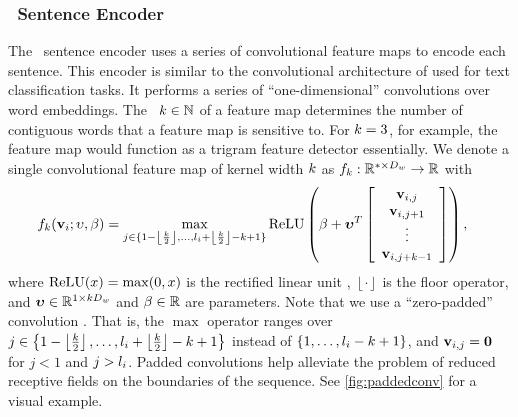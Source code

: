 \subsubsection{\ConvolutionalNeuralNetwork~Sentence Encoder} 
\label{sec:sentconvenc}

The \convolutionalneuralnetwork~sentence encoder uses a series of 
convolutional feature maps to encode each sentence. This encoder is similar
to the convolutional architecture of \citet{kim2014convolutional} used for 
text classification tasks. It performs a series of ``one-dimensional'' 
convolutions over word embeddings. The ~$k \in 
\mathbb{N}$ of a feature map determines the number of contiguous words that a 
feature map is sensitive to. For $k=3$, for example, the feature 
map would function as a trigram feature detector essentially. 
We denote a single convolutional feature map of kernel width 
$k$ as $f_k : \mathbb{R}^{*\times D_{w}} \rightarrow \mathbb{R}$ with
\begin{align}
    f_k(\mathbf{v}_i;\upsilon,\beta)  & 
= \max_{j \in \{ 
    1 - \left\lfloor \frac{k}{2} \right\rfloor, 
    \ldots, l_i +  
    \left\lfloor \frac{k}{2} \right\rfloor - k + 1 \}}
  \operatorname{ReLU}\left( \beta + \boldsymbol{\upsilon}^T \left[ \begin{array}{c} \mathbf{v}_{i,j}\\ \mathbf{v}_{i,j+1} \\ \vdots \\ \mathbf{v}_{i,j+k-1} \end{array} \right] \right),
\end{align}
where $\operatorname{ReLU}(x) = \max(0, x)$ is the rectified linear unit \citep{relu},
$\left\lfloor\cdot\right\rfloor$ is the floor operator,
and $\boldsymbol{\upsilon} \in \mathbb{R}^{1 \times k D_{w}}$
and $\beta \in \mathbb{R}$ are parameters. Note that we use a ``zero-padded'' 
convolution \cite{cnnarithmatic}. That is, the $\max$ operator ranges
over  $j \in \left\{1 - \left\lfloor \frac{k}{2} \right\rfloor, \ldots, 
    l_i +  \left\lfloor \frac{k}{2} \right\rfloor - k + 1
\right\}$ instead of $\left\{1,\ldots,l_i - k + 1\right\}$, and $\mathbf{v}_{i,j} = \mathbf{0}$ for
$j < 1$ and $j > l_i$. Padded convolutions help
alleviate the problem of reduced receptive fields on the boundaries 
of the sequence. See \autoref{fig:paddedconv} for a visual example.


